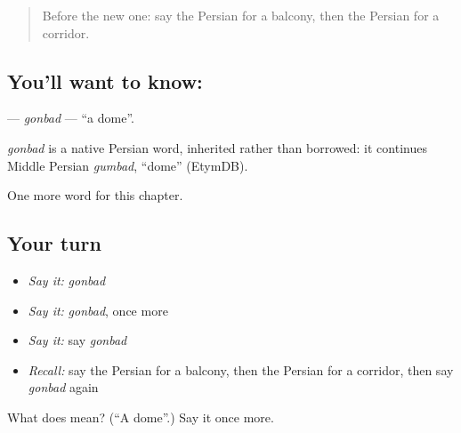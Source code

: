 \label{lesson:FA-C195-gonbad}



\begin{quote}
Before the new one: say the Persian for a balcony, then the Persian for a corridor.
\end{quote}

\subsection*{You'll want to know: }
\textbf{} — \emph{gonbad} — \textquotedblleft{}a dome\textquotedblright{}.

\begin{cousinweb}
\emph{gonbad} is a native Persian word, inherited rather than borrowed: it continues Middle Persian \emph{gumbad}, \textquotedblleft{}dome\textquotedblright{} (EtymDB).
\end{cousinweb}

\begin{grammarlens}[title={What you've built}]
One more word for this chapter.
\end{grammarlens}

\subsection*{Your turn}
\begin{itemize}
\raggedright
  \item \emph{Say it:} \emph{gonbad}
  \item \emph{Say it:} \emph{gonbad}, once more
  \item \emph{Say it:} say \emph{gonbad}
  \item \emph{Recall:} say the Persian for a balcony, then the Persian for a corridor, then say \emph{gonbad} again
\end{itemize}

\begin{tcolorbox}[breakable,colback=teal!4,colframe=teal!35!black,title={Before you move on}]
What does  mean? (\textquotedblleft{}A dome\textquotedblright{}.) Say it once more.
\end{tcolorbox}
